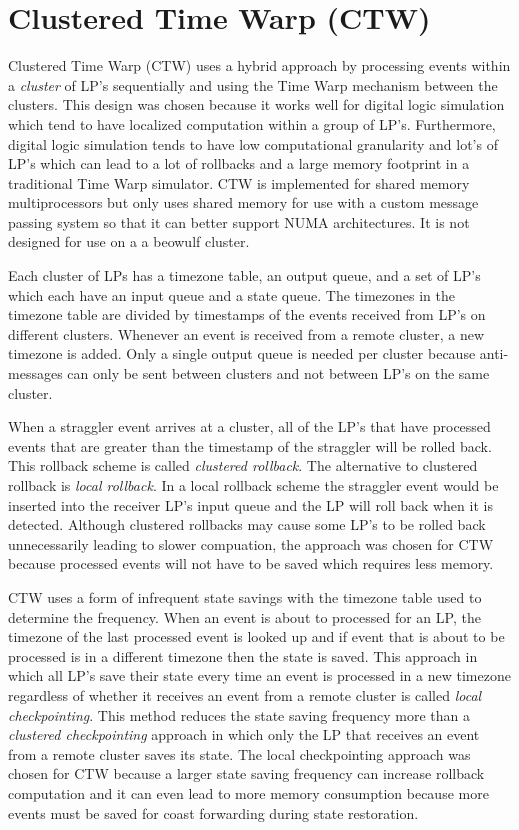 \documentclass[11pt]{book}
\begin{document}
\section{Clustered Time Warp (CTW)}

Clustered Time Warp\cite{avril-95} (CTW) uses a hybrid approach by processing events within
a \emph{cluster} of LP's sequentially and using the Time Warp mechanism between the clusters.
This design was chosen because it works well for digital logic simulation which tend to have
localized computation within a group of LP's. Furthermore, digital logic simulation tends to
have low computational granularity and lot's of LP's which can lead to a lot of rollbacks
and a large memory footprint in a traditional Time Warp simulator. CTW is implemented for
shared memory multiprocessors but only uses shared memory for use with a custom message passing
system so that it can better support NUMA architectures. It is not designed for use on a
a beowulf cluster.

Each cluster of LPs has a timezone table, an output queue, and a set of LP's which each have an
input queue and a state queue. The timezones in the timezone table are divided by timestamps
of the events received from LP's on different clusters. Whenever an event is received from
a remote cluster, a new timezone is added. Only a single output queue is needed per cluster
because anti-messages can only be sent between clusters and not between LP's on the same
cluster.

When a straggler event arrives at a cluster, all of the LP's that have processed events that
are greater than the timestamp of the straggler will be rolled back. This rollback scheme is
called \emph{clustered rollback}. The alternative to clustered rollback is \emph{local
rollback}. In a local rollback scheme the straggler event would be inserted into the receiver
LP's input queue and the LP will roll back when it is detected. Although clustered rollbacks
may cause some LP's to be rolled back unnecessarily leading to slower compuation, the
approach was chosen for CTW because processed events will not have to be saved which
requires less memory.

CTW uses a form of infrequent state savings with the timezone table used to determine the
frequency. When an event is about to processed for an LP, the timezone of the last processed
event is looked up and if event that is about to be processed is in a different timezone then
the state is saved. This approach in which all LP's save their state every time an event is
processed in a new timezone regardless of whether it receives an event from a remote cluster
is called \emph{local checkpointing}. This method reduces the state saving frequency more
than a \emph{clustered checkpointing} approach in which only the LP that receives an event
from a remote cluster saves its state. The local checkpointing approach was chosen for CTW
because a larger state saving frequency can increase rollback computation and it can even
lead to more memory consumption because more events must be saved for coast forwarding
during state restoration.
\end{document}
